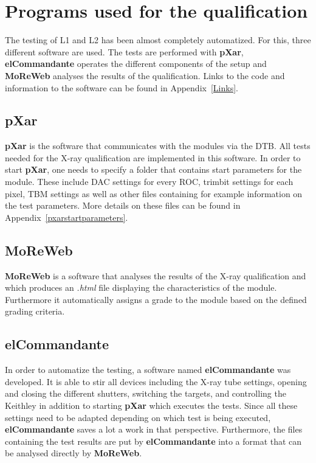 \documentclass[a4paper,12pt,twoside]{article}
\begin{document}
\section{Programs used for the qualification}

The testing of L1 and L2 has been almost completely automatized. For this, three different software are used. The tests are performed with \textbf{pXar}, \textbf{elCommandante} operates the different components of the setup and \textbf{MoReWeb} analyses the results of the qualification. Links to the code and information to the software can be found in Appendix~\ref{Links}.

\subsection{pXar}

\textbf{pXar} is the software that communicates with the modules via the DTB. All tests needed for the X-ray qualification are implemented in this software. In order to start \textbf{pXar}, one needs to specify a folder that contains start parameters for the module. These include DAC settings for every ROC, trimbit settings for each pixel, TBM settings as well as other files containing for example information on the test parameters. More details on these files can be found in Appendix~\ref{pxarstartparameters}.

\subsection{MoReWeb}

\textbf{MoReWeb} is a software that analyses the results of the X-ray qualification and which produces an \textit{.html} file displaying the characteristics of the module. Furthermore it automatically assigns a grade to the module based on the defined grading criteria. 


\subsection{elCommandante}

In order to automatize the testing, a software named \textbf{elCommandante} was developed. It is able to stir all devices including the X-ray tube settings, opening and closing the different shutters, switching the targets, and controlling the Keithley in addition to starting \textbf{pXar} which executes the tests. Since all these settings need to be adapted depending on which test is being executed, \textbf{elCommandante} saves a lot a work in that perspective. Furthermore, the files containing the test results are put by \textbf{elCommandante} into a format that can be analysed directly by \textbf{MoReWeb}. 
\end{document}
